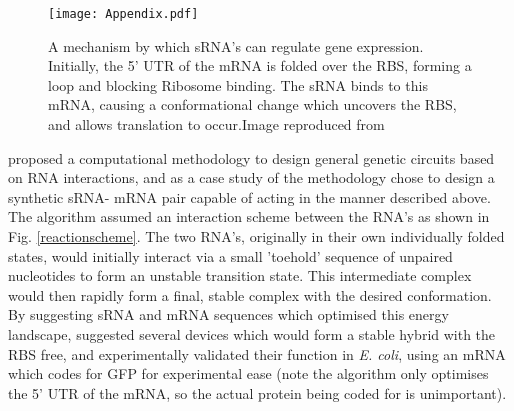 \documentclass[10pt,journal]{./IEEE_latex_class/IEEEtran}
\begin{document}
\begin{figure}[H]
\centering
\texttt{[image: Appendix.pdf]}
\caption{A mechanism by which sRNA's can regulate gene expression. Initially, the 5' UTR of the mRNA is folded over the RBS, forming a loop and blocking Ribosome binding. The sRNA binds to this mRNA, causing a conformational change which uncovers the RBS, and allows translation to occur.Image reproduced from \cite{Rodrigo2012} }
\label{RBS}
\end{figure}

\cite{Rodrigo2012} proposed a computational methodology to design general genetic circuits based on RNA interactions, and as a case study of the methodology chose to design a synthetic sRNA- mRNA pair capable of acting in the manner described above. The algorithm assumed an interaction scheme between the RNA's as shown in Fig. \ref{reactionscheme}. The two RNA's, originally in their own individually folded states, would initially interact via a small 'toehold' sequence of unpaired nucleotides to form an unstable transition state. This intermediate complex would then rapidly form a final, stable complex with the desired conformation. By suggesting sRNA and mRNA sequences which optimised this energy landscape, \cite{Rodrigo2012} suggested several devices which would form a stable hybrid with the RBS free, and experimentally validated their function in \textit{E. coli}, using an mRNA which codes for GFP for experimental ease (note the algorithm only optimises the 5' UTR of the mRNA, so the actual protein being coded for is unimportant).
\end{document}
